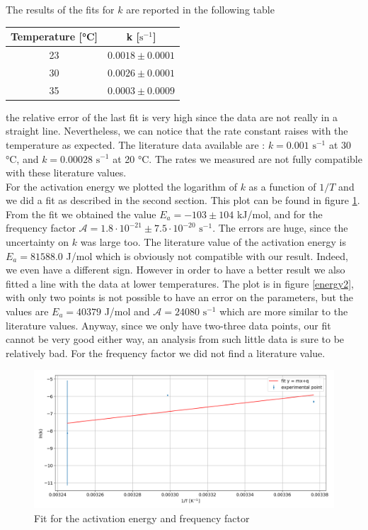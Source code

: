 \documentclass[a4paper,10pt]{article}
\begin{document}
The results of the fits for $k$ are reported in the following table
\begin{table}[H]
\centering
\begin{tabular}{c|c}
 Temperature [°C] & k [$\text{s}^{-1}$] \\
  \hline
  23 & $0.0018\pm 0.0001$ \\
 
   30 & $0.0026\pm 0.0001 $ \\
  
  35 & $0.0003\pm  0.0009$\\
  \hline
\end{tabular}
\end{table} 
the relative error of the last fit is very high since the data are not really in a straight line. Nevertheless, we can notice that the rate constant raises with the temperature as expected. The literature data available are \cite{k}: $k = 0.001$ $\text{s}^{-1}$ at 30 °C, and $k = 0.00028$ $\text{s}^{-1}$ at 20 °C. The rates we measured are not fully compatible with these literature values.\\
For the activation energy we plotted the logarithm of $k$ as a function of $1/T$ and we did a fit as described in the second section. This plot can be found in figure \ref{energy}. From the fit we obtained the value $E_a = -103 \pm 104$ kJ/mol, and for the frequency factor $\mathcal{A} = 1.8\cdot 10^{-21}\pm7.5\cdot 10^{-20}$ $\text{s}^{-1}$. The errors are huge, since the uncertainty on $k$ was large too. The literature value \cite{k} of the activation energy is $E_a = 81588.0$ J/mol which is obviously not compatible with our result. Indeed, we even have a different sign. However in order to have a better result we also fitted a line with the data at lower temperatures. The plot is in figure \ref{energy2}, with only two points is not possible to have an error on the parameters, but the values are $E_a = 40379$ J/mol and $\mathcal{A} = 24080$ $\text{s}^{-1}$ which are more similar to the literature values. Anyway, since we only have two-three data points, our fit cannot be very good either way, an analysis from such little data is sure to be relatively bad. For the frequency factor we did not find a literature value. 
\begin{figure}[H]
\centering
\includegraphics[width=\textwidth]{energy}
\caption{Fit for the activation energy and frequency factor}\label{energy}
\end{figure}
\end{document}
